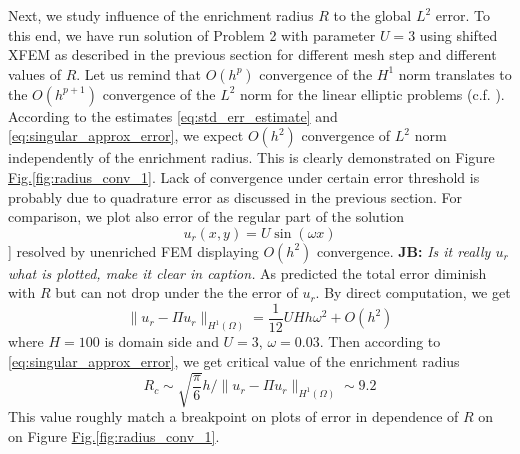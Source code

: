 \documentclass[preprint,12pt]{elsarticle}
\newcommand{\fig}[1]{\hyperref[#1]{Fig.\ref{#1}}}
\def\norm#1{\| #1 \|}
\newcommand{\noteJB}[1]{{\color{Blue} \textbf{JB: } \textit{#1}}}
\begin{document}
Next, we study influence of the enrichment radius $R$ to the global $L^2$ error. To this end, we have run solution of Problem 2 with parameter $U=3$
using shifted XFEM as described in the previous section for different mesh step and different values of $R$.
Let us remind that $O(h^p)$ convergence of the $H^1$ norm translates to the $O(h^{p+1})$ convergence of the $L^2$ norm 
for the linear elliptic problems (c.f. \cite[Theorem 19.2]{ciarlet_basic_1991}). According to the estimates \eqref{eq:std_err_estimate}
and \eqref{eq:singular_approx_error}, we expect $O(h^2)$ convergence of $L^2$ norm independently of the enrichment radius. This is 
clearly demonstrated on Figure \fig{fig:radius_conv_1}. Lack of convergence under certain error threshold is probably due to 
quadrature error as discussed in the previous section. For comparison, we plot also error of the regular part of the solution
\[
  u_r(x,y) = U \sin (\omega x)
\]
]
resolved by unenriched FEM displaying $O(h^2)$ convergence. \noteJB{Is it really $u_r$ what is plotted, make it clear in caption.}
As predicted the total error diminish with $R$ but can not 
drop under the the error of $u_r$. By direct computation, we get
\[
  \norm{u_r - \Pi u_r}_{H^1(\Omega)} = \frac{1}{12}UHh\omega^2 + O(h^2)
\]
where $H=100$ is domain side and $U=3$, $\omega=0.03$. Then according to \eqref{eq:singular_approx_error},
we get critical value of the enrichment radius
\[
    R_c \sim \sqrt{\frac{\pi}{6}} h/\norm{u_r - \Pi u_r}_{H^1(\Omega)} \sim 9.2
\]
This value roughly match a breakpoint on plots of error in dependence of $R$ on 
on Figure \fig{fig:radius_conv_1}.
\end{document}
